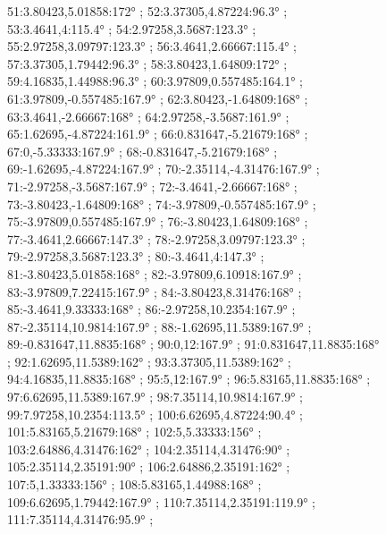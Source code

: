 \documentclass[a4paper,10pt,ngerman]{scrartcl}
\begin{document}
\begin{algorithm}[H]
\begin{figure}[!h]
{                51:3.80423,5.01858:172° ;
                52:3.37305,4.87224:96.3° ;
                53:3.4641,4:115.4° ;
                54:2.97258,3.5687:123.3° ;
                55:2.97258,3.09797:123.3° ;
                56:3.4641,2.66667:115.4° ;
                57:3.37305,1.79442:96.3° ;
                58:3.80423,1.64809:172° ;
                59:4.16835,1.44988:96.3° ;
                60:3.97809,0.557485:164.1° ;
                61:3.97809,-0.557485:167.9° ;
                62:3.80423,-1.64809:168° ;
                63:3.4641,-2.66667:168° ;
                64:2.97258,-3.5687:161.9° ;
                65:1.62695,-4.87224:161.9° ;
                66:0.831647,-5.21679:168° ;
                67:0,-5.33333:167.9° ;
                68:-0.831647,-5.21679:168° ;
                69:-1.62695,-4.87224:167.9° ;
                70:-2.35114,-4.31476:167.9° ;
                71:-2.97258,-3.5687:167.9° ;
                72:-3.4641,-2.66667:168° ;
                73:-3.80423,-1.64809:168° ;
                74:-3.97809,-0.557485:167.9° ;
                75:-3.97809,0.557485:167.9° ;
                76:-3.80423,1.64809:168° ;
                77:-3.4641,2.66667:147.3° ;
                78:-2.97258,3.09797:123.3° ;
                79:-2.97258,3.5687:123.3° ;
                80:-3.4641,4:147.3° ;
                81:-3.80423,5.01858:168° ;
                82:-3.97809,6.10918:167.9° ;
                83:-3.97809,7.22415:167.9° ;
                84:-3.80423,8.31476:168° ;
                85:-3.4641,9.33333:168° ;
                86:-2.97258,10.2354:167.9° ;
                87:-2.35114,10.9814:167.9° ;
                88:-1.62695,11.5389:167.9° ;
                89:-0.831647,11.8835:168° ;
                90:0,12:167.9° ;
                91:0.831647,11.8835:168° ;
                92:1.62695,11.5389:162° ;
                93:3.37305,11.5389:162° ;
                94:4.16835,11.8835:168° ;
                95:5,12:167.9° ;
                96:5.83165,11.8835:168° ;
                97:6.62695,11.5389:167.9° ;
                98:7.35114,10.9814:167.9° ;
                99:7.97258,10.2354:113.5° ;
                100:6.62695,4.87224:90.4° ;
                101:5.83165,5.21679:168° ;
                102:5,5.33333:156° ;
                103:2.64886,4.31476:162° ;
                104:2.35114,4.31476:90° ;
                105:2.35114,2.35191:90° ;
                106:2.64886,2.35191:162° ;
                107:5,1.33333:156° ;
                108:5.83165,1.44988:168° ;
                109:6.62695,1.79442:167.9° ;
                110:7.35114,2.35191:119.9° ;
                111:7.35114,4.31476:95.9° ;
}
\end{figure}
\end{algorithm}
\end{document}
